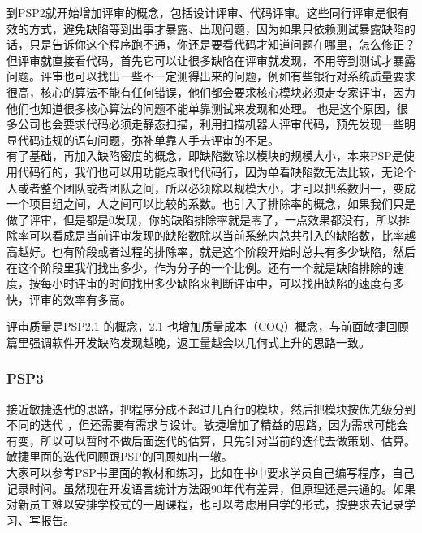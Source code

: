 到PSP2就开始增加评审的概念，包括设计评审、代码评审。这些同行评审是很有效的方式，避免缺陷等到出事才暴露、出现问题，因为如果只依赖测试暴露缺陷的话，只是告诉你这个程序跑不通，你还是要看代码才知道问题在哪里，怎么修正？但评审就直接看代码，首先它可以让很多缺陷在评审就发现，不用等到测试才暴露问题。评审也可以找出一些不一定测得出来的问题，例如有些银行对系统质量要求很高，核心的算法不能有任何错误，他们都会要求核心模块必须走专家评审，因为他们也知道很多核心算法的问题不能单靠测试来发现和处理。
也是这个原因，很多公司也会要求代码必须走静态扫描，利用扫描机器人评审代码，预先发现一些明显代码违规的语句问题，弥补单靠人手去评审的不足。\\
有了基础，再加入缺陷密度的概念，即缺陷数除以模块的规模大小，本来PSP是使用代码行的，我们也可以用功能点取代代码行，因为单看缺陷数无法比较，无论个人或者整个团队或者团队之间，所以必须除以规模大小，才可以把系数归一，变成一个项目组之间，人之间可以比较的系数。也引入了排除率的概念，如果我们只是做了评审，但是都是0发现，你的缺陷排除率就是零了，一点效果都没有，所以排除率可以看成是当前评审发现的缺陷数除以当前系统内总共引入的缺陷数，比率越高越好。也有阶段或者过程的排除率，就是这个阶段开始时总共有多少缺陷，然后在这个阶段里我们找出多少，作为分子的一个比例。还有一个就是缺陷排除的速度，按每小时评审的时间找出多少缺陷来判断评审中，可以找出缺陷的速度有多快，评审的效率有多高。

评审质量是PSP2.1 的概念，2.1
也增加质量成本（COQ）概念，与前面敏捷回顾篇里强调软件开发缺陷发现越晚，返工量越会以几何式上升的思路一致。

\hypertarget{psp3}{%
\subsubsection{PSP3}\label{psp3}}

接近敏捷迭代的思路，把程序分成不超过几百行的模块，然后把模块按优先级分到不同的迭代
，但还需要有需求与设计。敏捷增加了精益的思路，因为需求可能会有变，所以可以暂时不做后面迭代的估算，只先针对当前的迭代去做策划、估算。
敏捷里面的迭代回顾跟PSP的回顾如出一辙。\\
大家可以参考PSP书里面的教材和练习，比如在书中要求学员自己编写程序，自己记录时间。虽然现在开发语言统计方法跟90年代有差异，但原理还是共通的。如果对新员工难以安排学校式的一周课程，也可以考虑用自学的形式，按要求去记录学习、写报告。


